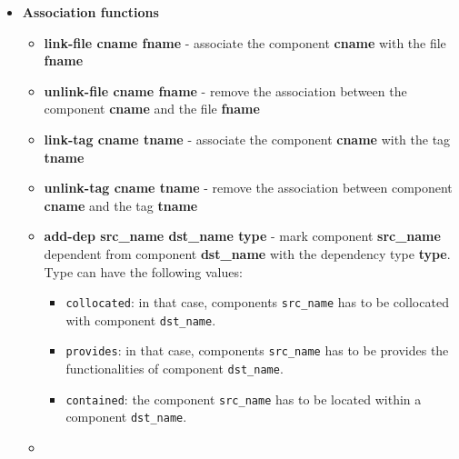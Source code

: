 \documentclass[11pt]{book}
\begin{document}
\begin{itemize}
   \item
      \textbf{Association functions}
      \begin{itemize}
         \item
            \textbf{link-file cname fname} - associate the component
                                    \textbf{cname} with the file \textbf{fname}
         \item
            \textbf{unlink-file cname fname} - remove the association between
                                    the component \textbf{cname} and the file \textbf{fname}
         \item
            \textbf{link-tag cname tname} - associate the component
                                            \textbf{cname} with the tag \textbf{tname}
         \item
            \textbf{unlink-tag cname tname} - remove the association between component
                                             \textbf{cname} and the tag \textbf{tname}
         \item
            \textbf{add-dep src\_name dst\_name type} - mark component \textbf{src\_name}
                                 dependent from component \textbf{dst\_name}
                                 with the dependency type \textbf{type}. Type
                                 can have the following values:
                                 \begin{itemize}
                                    \item
                                       \texttt{collocated}: in that case,
                                       components \texttt{src\_name} has to be
                                       collocated with component
                                       \texttt{dst\_name}.
                                    \item
                                       \texttt{provides}: in that case,
                                       components \texttt{src\_name} has to be
                                       provides the functionalities of
                                       component \texttt{dst\_name}.
                                    \item
                                       \texttt{contained}: the component
                                       \texttt{src\_name} has to be located
                                       within a component \texttt{dst\_name}.
                                 \end{itemize}
         \item

\end{itemize}
\end{itemize}
\end{document}
